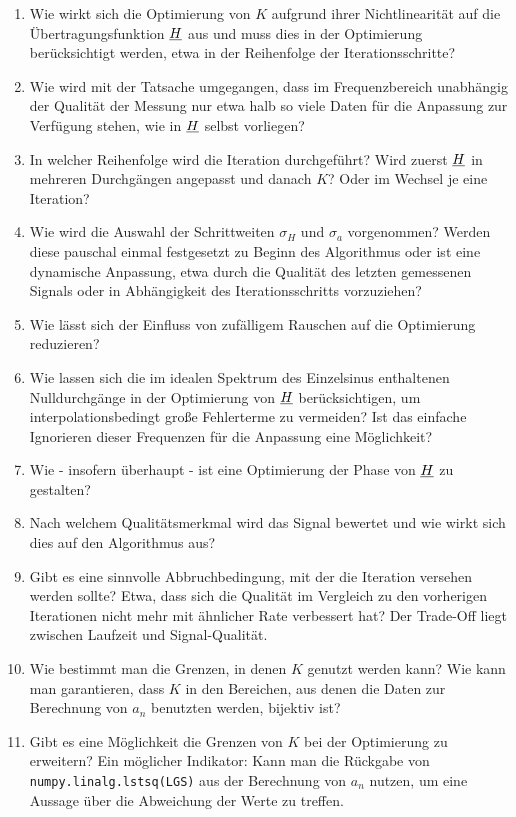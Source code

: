 \documentclass[../Report.tex]{subfiles}
\begin{document}
\begin{enumerate}
	\item 	Wie wirkt sich die Optimierung von $K$ aufgrund ihrer Nichtlinearität auf die Übertragungsfunktion $\underline{H}$ aus und muss dies in der Optimierung berücksichtigt werden, etwa in der Reihenfolge der Iterationsschritte?
	
	\item	Wie wird mit der Tatsache umgegangen, dass im Frequenzbereich unabhängig der Qualität der Messung nur etwa halb so viele Daten für die Anpassung zur Verfügung stehen, wie in $\underline{H}$ selbst vorliegen?
	
	\item	In welcher Reihenfolge wird die Iteration durchgeführt? Wird zuerst $\underline{H}$ in mehreren Durchgängen angepasst und danach $K$? Oder im Wechsel je eine Iteration?
	
	\item 	Wie wird die Auswahl der Schrittweiten $\sigma_H$ und $\sigma_a$ vorgenommen? Werden diese pauschal einmal festgesetzt zu Beginn des Algorithmus oder ist eine dynamische Anpassung, etwa durch die Qualität des letzten gemessenen Signals oder in Abhängigkeit des Iterationsschritts vorzuziehen? 
	
	\item 	\label{enum:opt.noise}Wie lässt sich der Einfluss von zufälligem Rauschen auf die Optimierung reduzieren? 
	
	\item	\label{enum:opt.zeros}Wie lassen sich die im idealen Spektrum des Einzelsinus enthaltenen Nulldurchgänge in der Optimierung von $\underline{H}$ berücksichtigen, um interpolationsbedingt große Fehlerterme zu vermeiden? Ist das einfache Ignorieren dieser Frequenzen für die Anpassung eine Möglichkeit?
	
	\item 	Wie - insofern überhaupt - ist eine Optimierung der Phase von $\underline{H}$ zu gestalten?
	
	\item	Nach welchem Qualitätsmerkmal wird das Signal bewertet und wie wirkt sich dies auf den Algorithmus aus?
	
	\item	Gibt es eine sinnvolle Abbruchbedingung, mit der die Iteration versehen werden sollte? Etwa, dass sich die Qualität im Vergleich zu den vorherigen Iterationen nicht mehr mit ähnlicher Rate verbessert hat? Der Trade-Off liegt zwischen Laufzeit und Signal-Qualität.
	
	\item	Wie bestimmt man die Grenzen, in denen $K$ genutzt werden kann? Wie kann man garantieren, dass $K$ in den Bereichen, aus denen die Daten zur Berechnung von $a_n$ benutzten werden, bijektiv ist?
	
	\item	Gibt es eine Möglichkeit die Grenzen von $K$ bei der Optimierung zu erweitern? Ein möglicher Indikator: Kann man die Rückgabe von \lstinline{numpy.linalg.lstsq(LGS)} aus der Berechnung von $a_n$ nutzen, um eine Aussage über die Abweichung der Werte zu treffen.
\end{enumerate}
\end{document}
